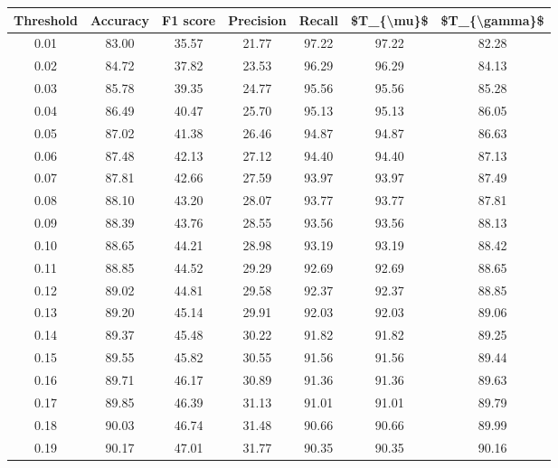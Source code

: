 \begin{tabular}{|c|c|c|c|c|c|c|}
\hline
 Threshold &  Accuracy &  F1 score &  Precision &  Recall &  \$T\_\{\textbackslash mu\}\$ &  \$T\_\{\textbackslash gamma\}\$ \\
\hline
      0.01 &     83.00 &     35.57 &      21.77 &   97.22 &      97.22 &         82.28 \\
      0.02 &     84.72 &     37.82 &      23.53 &   96.29 &      96.29 &         84.13 \\
      0.03 &     85.78 &     39.35 &      24.77 &   95.56 &      95.56 &         85.28 \\
      0.04 &     86.49 &     40.47 &      25.70 &   95.13 &      95.13 &         86.05 \\
      0.05 &     87.02 &     41.38 &      26.46 &   94.87 &      94.87 &         86.63 \\
      0.06 &     87.48 &     42.13 &      27.12 &   94.40 &      94.40 &         87.13 \\
      0.07 &     87.81 &     42.66 &      27.59 &   93.97 &      93.97 &         87.49 \\
      0.08 &     88.10 &     43.20 &      28.07 &   93.77 &      93.77 &         87.81 \\
      0.09 &     88.39 &     43.76 &      28.55 &   93.56 &      93.56 &         88.13 \\
      0.10 &     88.65 &     44.21 &      28.98 &   93.19 &      93.19 &         88.42 \\
      0.11 &     88.85 &     44.52 &      29.29 &   92.69 &      92.69 &         88.65 \\
      0.12 &     89.02 &     44.81 &      29.58 &   92.37 &      92.37 &         88.85 \\
      0.13 &     89.20 &     45.14 &      29.91 &   92.03 &      92.03 &         89.06 \\
      0.14 &     89.37 &     45.48 &      30.22 &   91.82 &      91.82 &         89.25 \\
      0.15 &     89.55 &     45.82 &      30.55 &   91.56 &      91.56 &         89.44 \\
      0.16 &     89.71 &     46.17 &      30.89 &   91.36 &      91.36 &         89.63 \\
      0.17 &     89.85 &     46.39 &      31.13 &   91.01 &      91.01 &         89.79 \\
      0.18 &     90.03 &     46.74 &      31.48 &   90.66 &      90.66 &         89.99 \\
      0.19 &     90.17 &     47.01 &      31.77 &   90.35 &      90.35 &         90.16 \\

\end{tabular}
